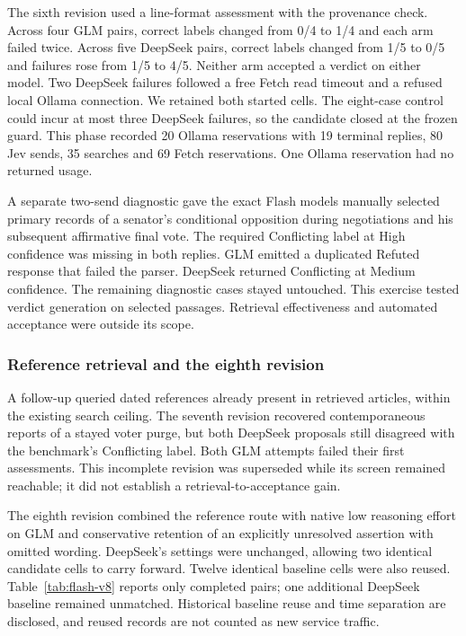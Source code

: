 \documentclass[conference]{IEEEtran}
\begin{document}
The sixth revision used a line-format assessment with the provenance check. Across four GLM pairs, correct labels changed from 0/4 to 1/4 and each arm failed twice. Across five DeepSeek pairs, correct labels changed from 1/5 to 0/5 and failures rose from 1/5 to 4/5. Neither arm accepted a verdict on either model. Two DeepSeek failures followed a free Fetch read timeout and a refused local Ollama connection. We retained both started cells. The eight-case control could incur at most three DeepSeek failures, so the candidate closed at the frozen guard. This phase recorded 20 Ollama reservations with 19 terminal replies, 80 Jev sends, 35 searches and 69 Fetch reservations. One Ollama reservation had no returned usage.

A separate two-send diagnostic gave the exact Flash models manually selected primary records of a senator's conditional opposition during negotiations and his subsequent affirmative final vote. The required Conflicting label at High confidence was missing in both replies. GLM emitted a duplicated Refuted response that failed the parser. DeepSeek returned Conflicting at Medium confidence. The remaining diagnostic cases stayed untouched. This exercise tested verdict generation on selected passages. Retrieval effectiveness and automated acceptance were outside its scope.

\subsubsection{Reference retrieval and the eighth revision}
A follow-up queried dated references already present in retrieved articles, within the existing search ceiling. The seventh revision recovered contemporaneous reports of a stayed voter purge, but both DeepSeek proposals still disagreed with the benchmark's Conflicting label. Both GLM attempts failed their first assessments. This incomplete revision was superseded while its screen remained reachable; it did not establish a retrieval-to-acceptance gain.

The eighth revision combined the reference route with native low reasoning effort on GLM and conservative retention of an explicitly unresolved assertion with omitted wording. DeepSeek's settings were unchanged, allowing two identical candidate cells to carry forward. Twelve identical baseline cells were also reused. Table~\ref{tab:flash-v8} reports only completed pairs; one additional DeepSeek baseline remained unmatched. Historical baseline reuse and time separation are disclosed, and reused records are not counted as new service traffic.
\end{document}
